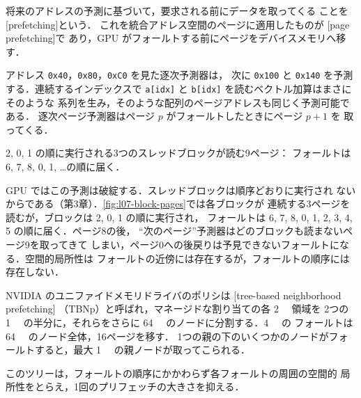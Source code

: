 \documentclass[../main.tex]{subfiles}
\begin{document}
\begin{definition}[プリフェッチ]
  \label{def:l07-prefetching}
  将来のアドレスの予測に基づいて，要求される前にデータを取ってくる
  ことを[prefetching]という．
  これを統合アドレス空間のページに適用したものが
  [page prefetching]で
  あり，GPU がフォールトする前にページをデバイスメモリへ移す．
\end{definition}

アドレス \texttt{0x40}，\texttt{0x80}，\texttt{0xC0} を見た逐次予測器は，
次に \texttt{0x100} と \texttt{0x140} を予測する．連続するインデックスで
\texttt{a[idx]} と \texttt{b[idx]} を読むベクトル加算はまさにそのような
系列を生み，そのような配列のページアドレスも同じく予測可能である．
逐次ページ予測器はページ $p$ がフォールトしたときにページ $p+1$ を
取ってくる．

\begin{marginfigure}
  
  \caption{2, 0, 1 の順に実行される3つのスレッドブロックが読む9ページ：
    フォールトは 6, 7, 8, 0, 1, \ldots の順に届く．}
  \label{fig:l07-block-pages}
\end{marginfigure}

GPU ではこの予測は破綻する．スレッドブロックは順序どおりに実行され
ないからである（第3章）．\cref{fig:l07-block-pages}では各ブロックが
連続する3ページを読むが，ブロックは 2, 0, 1 の順に実行され，
フォールトは 6, 7, 8, 0, 1, 2, 3, 4, 5 の順に届く．ページ8の後，
\enquote{次のページ}予測器はどのブロックも読まないページ9を取ってきて
しまい，ページ0への後戻りは予見できないフォールトになる．空間的局所性は
フォールトの近傍には存在するが，フォールトの順序には存在しない．

\begin{definition}[ツリーベース近傍プリフェッチ]
  \label{def:l07-tbnp}
  NVIDIA のユニファイドメモリドライバのポリシは
  [tree-based neighborhood prefetching]
  （TBNp）と呼ばれ，マネージドな割り当ての各 \SI{2}{\mebi\byte} 領域を
  2つの \SI{1}{\mebi\byte} の半分に，それらをさらに
  \SI{64}{\kibi\byte} のノードに分割する．\SI{4}{\kibi\byte} の
  フォールトは \SI{64}{\kibi\byte} のノード全体，16ページを移す．
  1つの親の下のいくつかのノードがフォールトすると，最大
  \SI{1}{\mebi\byte} の親ノードが取ってこられる．
\end{definition}

このツリーは，フォールトの順序にかかわらず各フォールトの周囲の空間的
局所性をとらえ，1回のプリフェッチの大きさを抑える．
\end{document}
